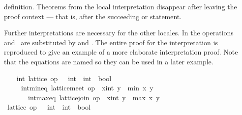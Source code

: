 \begin{isabellebody}
\begin{isamarkuptext}
  definition.  Theorems from the local interpretation disappear after
  leaving the proof context --- that is, after the succeeding
   or  statement.%
\end{isamarkuptext}%
\isamarkuptrue%
%
\isamarkuptrue%
%
\begin{isamarkuptext}%
Further interpretations are necessary for
  the other locales.  In  the operations~
  and~ are substituted by 
  and .  The entire proof for the
  interpretation is reproduced to give an example of a more
  elaborate interpretation proof.  Note that the equations are named
  so they can be used in a later example.%
\end{isamarkuptext}%
\isamarkuptrue%
%
\isadelimvisible
\ \ %
\endisadelimvisible
%
\isatagvisible
{}\isamarkupfalse%
\ int{}\ lattice\ {}op\ {}\ {}{}\ int\ {}\ int\ {}\ bool{}\isanewline
\ \ \ \ \ int{}min{}eq{}\ {}lattice{}meet\ op\ {}\ {}x{}{}int{}\ y\ {}\ min\ x\ y{}\isanewline
\ \ \ \ \ \ \ int{}max{}eq{}\ {}lattice{}join\ op\ {}\ {}x{}{}int{}\ y\ {}\ max\ x\ y{}\isanewline
\ \ \isamarkupfalse%
\ {}\isanewline
\ \ \ \ \isamarkupfalse%
\ {}lattice\ {}op\ {}\ {}{}\ int\ {}\ int\ {}\ bool{}{}%

\end{isabellebody}
